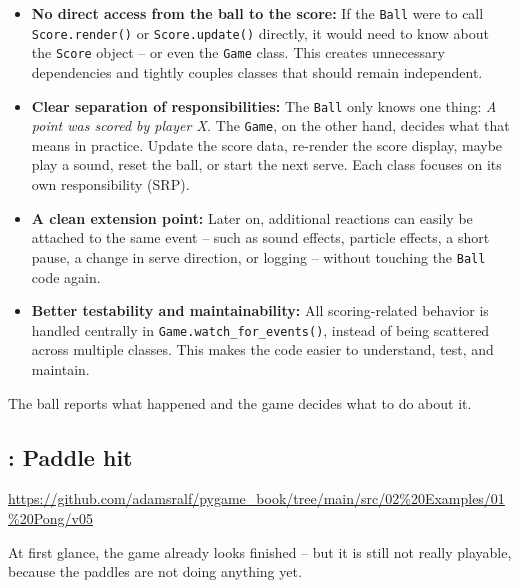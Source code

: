 \begin{hintbox}
\begin{itemize}
	\item \textbf{No direct access from the ball to the score:} 
	If the \texttt{Ball} were to call \texttt{Score.render()} or \texttt{Score.update()} directly, it would need to know about the \texttt{Score} object -- or even the \texttt{Game} class. This creates unnecessary dependencies and tightly couples classes that should remain independent.
	
	\item \textbf{Clear separation of responsibilities:}
	The \texttt{Ball} only knows one thing:	\emph{A point was scored by player X.} The \texttt{Game}, on the other hand, decides what that means in practice. Update the score data, re-render the score display, maybe play a sound, reset the ball, or start the next serve.	Each class focuses on its own responsibility (SRP).
	
	\item \textbf{A clean extension point:}
	Later on, additional reactions can easily be attached to the same event -- such as sound effects, particle effects, a short pause, a change in serve direction, or logging -- without touching the \texttt{Ball} code again.
	
	\item \textbf{Better testability and maintainability:}
	All scoring-related behavior is handled centrally in \texttt{Game.watch\_for\_events()}, instead of being scattered across multiple classes.
	This makes the code easier to understand, test, and maintain.
	
\end{itemize}
\end{hintbox}

The ball reports what happened and the game decides what to do about it.

\newpage
\subsection{: Paddle hit}
\begin{diskbox}
	\url{https://github.com/adamsralf/pygame_book/tree/main/src/02%20Examples/01%20Pong/v05}
\end{diskbox}
At first glance, the game already looks finished -- but it is still not really playable, because the paddles are not doing anything yet.

